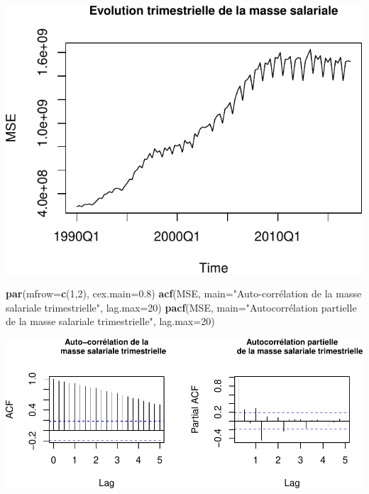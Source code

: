 \documentclass[11pt,]{article}
\newenvironment{Shaded}{\begin{snugshade}}{\end{snugshade}}
\newcommand{\KeywordTok}[1]{\textcolor[rgb]{0.13,0.29,0.53}{\textbf{{#1}}}}
\newcommand{\DataTypeTok}[1]{\textcolor[rgb]{0.13,0.29,0.53}{{#1}}}
\newcommand{\DecValTok}[1]{\textcolor[rgb]{0.00,0.00,0.81}{{#1}}}
\newcommand{\FloatTok}[1]{\textcolor[rgb]{0.00,0.00,0.81}{{#1}}}
\newcommand{\StringTok}[1]{\textcolor[rgb]{0.31,0.60,0.02}{{#1}}}
\newcommand{\NormalTok}[1]{{#1}}
\begin{document}
\begin{center}\includegraphics{doc_files/figure-latex/unnamed-chunk-1-1} \end{center}

\begin{Shaded}
\begin{Highlighting}[]
  \KeywordTok{par}\NormalTok{(}\DataTypeTok{mfrow=}\KeywordTok{c}\NormalTok{(}\DecValTok{1}\NormalTok{,}\DecValTok{2}\NormalTok{), }\DataTypeTok{cex.main=}\FloatTok{0.8}\NormalTok{)}
  \KeywordTok{acf}\NormalTok{(MSE, }\DataTypeTok{main=}\StringTok{"Auto-corrélation de la}
\StringTok{      masse salariale trimestrielle"}\NormalTok{, }\DataTypeTok{lag.max=}\DecValTok{20}\NormalTok{)}
  \KeywordTok{pacf}\NormalTok{(MSE, }\DataTypeTok{main=}\StringTok{"Autocorrélation partielle}
\StringTok{       de la masse salariale trimestrielle"}\NormalTok{, }\DataTypeTok{lag.max=}\DecValTok{20}\NormalTok{)}
\end{Highlighting}
\end{Shaded}

\includegraphics{doc_files/figure-latex/unnamed-chunk-2-1.pdf}
\end{document}
